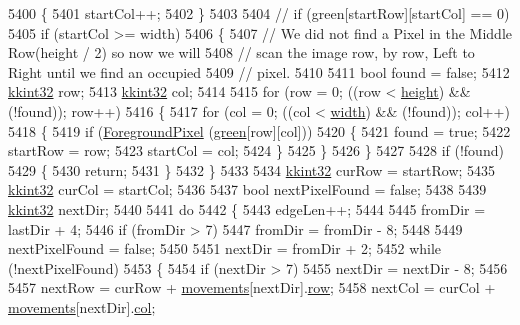 \begin{DoxyCode}
5400   \{
5401     startCol++;
5402   \}
5403 
5404   \textcolor{comment}{// if  (green[startRow][startCol] == 0)}
5405   \textcolor{keywordflow}{if}  (startCol >= width)
5406   \{
5407     \textcolor{comment}{// We did not find a Pixel in the Middle Row(height / 2) so now we will}
5408     \textcolor{comment}{// scan the image row, by row, Left to Right until we find an occupied }
5409     \textcolor{comment}{// pixel.}
5410 
5411     \textcolor{keywordtype}{bool}  found = \textcolor{keyword}{false};
5412     \hyperlink{namespace_k_k_b_a8fa4952cc84fda1de4bec1fbdd8d5b1b}{kkint32}  row;
5413     \hyperlink{namespace_k_k_b_a8fa4952cc84fda1de4bec1fbdd8d5b1b}{kkint32}  col;
5414 
5415     \textcolor{keywordflow}{for}  (row = 0; ((row < \hyperlink{class_k_k_b_1_1_raster_af39ff189de4fbb6de98392e187efafb7}{height})  &&  (!found));  row++)
5416     \{
5417       \textcolor{keywordflow}{for}  (col = 0; ((col < \hyperlink{class_k_k_b_1_1_raster_ae0bcc103e191c3421d7692dc69ceb554}{width})  &&  (!found)); col++)
5418       \{
5419         \textcolor{keywordflow}{if}  (\hyperlink{class_k_k_b_1_1_raster_aa1e1363589e719eb64f0957281b84b6a}{ForegroundPixel} (\hyperlink{class_k_k_b_1_1_raster_a2d2238911145488e226cd2e34fc8448c}{green}[row][col]))
5420         \{
5421           found = \textcolor{keyword}{true};
5422           startRow = row;
5423           startCol = col;
5424         \}
5425       \}
5426     \}
5427 
5428     \textcolor{keywordflow}{if}  (!found)
5429     \{
5430       \textcolor{keywordflow}{return};
5431     \}
5432   \}
5433 
5434   \hyperlink{namespace_k_k_b_a8fa4952cc84fda1de4bec1fbdd8d5b1b}{kkint32}  curRow = startRow;
5435   \hyperlink{namespace_k_k_b_a8fa4952cc84fda1de4bec1fbdd8d5b1b}{kkint32}  curCol = startCol;
5436 
5437   \textcolor{keywordtype}{bool}  nextPixelFound = \textcolor{keyword}{false};
5438 
5439   \hyperlink{namespace_k_k_b_a8fa4952cc84fda1de4bec1fbdd8d5b1b}{kkint32}  nextDir;
5440 
5441   \textcolor{keywordflow}{do}  
5442   \{
5443     edgeLen++;
5444 
5445     fromDir = lastDir + 4;
5446     \textcolor{keywordflow}{if}  (fromDir > 7)
5447       fromDir = fromDir - 8;
5448 
5449     nextPixelFound = \textcolor{keyword}{false};
5450 
5451     nextDir = fromDir + 2;
5452     \textcolor{keywordflow}{while}  (!nextPixelFound)
5453     \{
5454       \textcolor{keywordflow}{if}  (nextDir > 7)
5455         nextDir = nextDir - 8;
5456 
5457       nextRow = curRow + \hyperlink{_raster_8cpp_a4c248ea955a609e904037ab98cc73332}{movements}[nextDir].\hyperlink{struct_k_k_b_1_1_mov_dir_a19c78385b3fbec09dbe624baef003187}{row};
5458       nextCol = curCol + \hyperlink{_raster_8cpp_a4c248ea955a609e904037ab98cc73332}{movements}[nextDir].\hyperlink{struct_k_k_b_1_1_mov_dir_a454172afc7221cea2367c722c34e5517}{col};

\end{DoxyCode}
